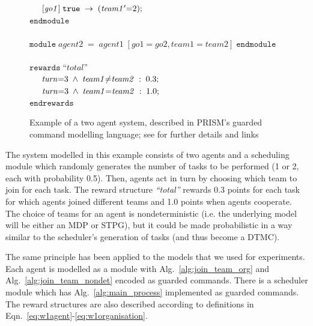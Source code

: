 \documentclass{llncs}
\newcommand{\prismkeyword}[1]{\mathtt{#1}}
\newcommand{\prismident}[1]{\mathit{#1}}
\newcommand{\prismtab}{\hspace*{0.5cm}}
\begin{document}
\begin{figure}[t]
{{\begin{minipage}{6in}
\begin{tabbing}
\mbox{$\prismtab[\prismident{go1}] \; \prismkeyword{true} \; \rightarrow \; (\prismident{team1'}{=}2);$} \\
\mbox{$\prismkeyword{endmodule}$} \\
\mbox{} \\
\mbox{$\prismkeyword{module} \; \prismident{agent2} \; {=} \; \prismident{agent1} \; [\prismident{go1}{=}\prismident{go2},\prismident{team1}{=}\prismident{team2}] \; \prismkeyword{endmodule}$} \\
\mbox{} \\
\mbox{$\prismkeyword{rewards} \; \mbox{``}\prismident{total}\mbox{''}$} \\
\mbox{$\prismtab\prismident{turn}{=}3 \; \wedge \; \prismident{team1}{\neq}\prismident{team2} \; : \; 0.3;\prismtab$} \\
\mbox{$\prismtab\prismident{turn}{=}3 \; \wedge \; \prismident{team1}{=}\prismident{team2} \; : \; 1.0;$} \\
\mbox{$\prismkeyword{endrewards}$}
\end{tabbing}
\end{minipage}}}
\caption{Example of a two agent system, described in PRISM's guarded command modelling language;
see \cite{KNP11} for further details and links}
\label{fig:prism_example}
\end{figure}
%
The system modelled in this example consists of two agents and a scheduling module which randomly generates the number of tasks to be performed (1 or 2, each with probability 0.5). Then, agents act in turn by choosing which team to join for each task. The reward structure \emph{``total''} rewards 0.3 points for each task for which agents joined different teams and 1.0 points when agents cooperate. The  choice of teams for an agent is nondeterministic (i.e. the underlying model will be either an MDP or STPG), but it could be made probabilistic in a way similar to the scheduler's generation of tasks (and thus become a DTMC).

The same principle has been applied to the models that we used for experiments. Each agent is modelled as a module with Alg.~\ref{alg:join_team_org} and Alg.~\ref{alg:join_team_nondet} encoded as guarded commands. There is a scheduler module which has Alg.~\ref{alg:main_process} implemented as guarded commands. The reward structures are also described %
according to definitions in Eqn.~\eqref{eq:w1agent}-\eqref{eq:w1organisation}.
\end{document}
